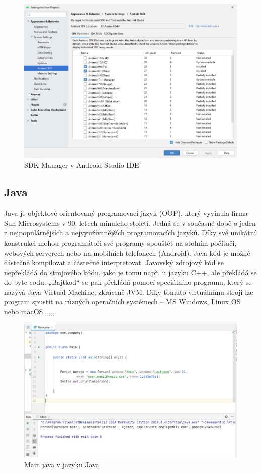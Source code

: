 \documentclass{vskpou} %
\begin{document}
 \begin{figure}[h!]
\centering
\includegraphics[scale=0.5]{images/8.jpg}
\caption{SDK Manager v Android Studio IDE}
\label{8}
\end{figure}
\newpage
\subsection{Java}
Java je objektově orientovaný programovací jazyk (OOP), který vyvinula firma Sun Microsystems v 90. letech minulého století. Jedná se v současné době o jeden z nejpopulárnějších a nejvyužívanějších programovacích jazyků. Díky své unikátní konstrukci mohou programátoři své programy spouštět na stolním počítači, webových serverech nebo na mobilních telefonech (Android). Java kód je možné částečně kompilovat a částečně interpretovat. Javovský zdrojový kód se nepřekládá do strojového kódu, jako je tomu např. u jazyku C++, ale překládá se do byte codu. „Bajtkod“ se pak překládá pomocí speciálního programu, který se nazývá Java Virtual Machine, zkráceně JVM. Díky tomuto virtuálnímu stroji lze program spustit na různých operačních systémech – MS Windows, Linux OS nebo macOS.\cite{5},\cite{7},\cite{13},\cite{14},\cite{15},\cite{16}    

 \begin{figure}[h!]
\centering
\includegraphics[scale=0.5]{images/9.jpg}
\caption{Main.java v jazyku Java}
\label{9}
\end{figure}
\end{document}
